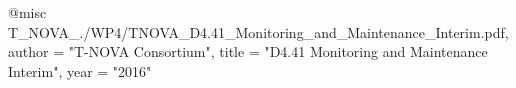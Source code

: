@misc{ T_NOVA_./WP4/TNOVA_D4.41_Monitoring_and_Maintenance_Interim.pdf,
       author = "{T-NOVA Consortium}",
       title = "D4.41 Monitoring and Maintenance Interim",
       year = "2016" }
